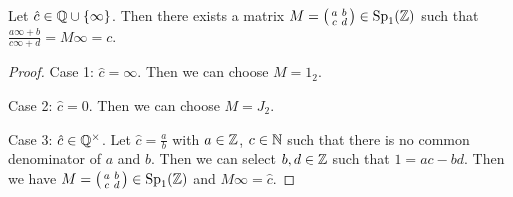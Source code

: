 \begin{lemma}
\label{lemma:cuspmatrixMc}
Let $\hat{c} \in \Q \cup \Set{\infty}$. Then there exists a matrix $M = \left( \begin{smallmatrix} a & b \\ c & d \end{smallmatrix} \right) \in \operatorname{Sp}_1(\mathbb{Z})$ such that $\frac{a \infty + b}{c \infty + d} = M \infty = c$. 
\begin{proof}
Case 1: $\hat{c} = \infty$. Then we can choose $M = 1_2$.

Case 2: $\hat{c} = 0$. Then we can choose $M = J_2$.

Case 3: $\hat{c} \in \mathbb{Q}^\times$. Let $\hat{c} = \frac{a}{b}$ with $a \in \mathbb{Z}$, $c \in \mathbb{N}$ such that there is no common denominator of $a$ and $b$. Then we can select $b, d \in \mathbb{Z}$ such that $1 = a c - b d$. Then we have $M = \left( \begin{smallmatrix} a & b \\ c & d \end{smallmatrix} \right) \in \operatorname{Sp}_1(\mathbb{Z})$ and $M \infty = \hat{c}$.
\end{proof}
\end{lemma}

